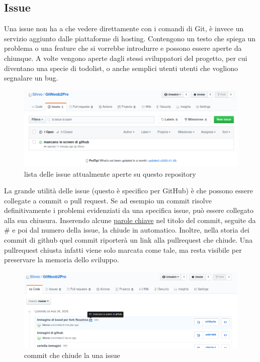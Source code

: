 \documentclass{article} \usepackage[textwidth=19cm,textheight=24cm]{geometry}
\begin{document}
\subsection{Issue}
Una issue non ha a che vedere direttamente con i comandi di Git, è invece un
servizio aggiunto dalle piattaforme di hosting. Contengono un testo che spiega
un problema o una feature che si vorrebbe introdurre e possono essere aperte da
chiunque.
A volte vengono aperte dagli stessi sviluppatori del progetto, per cui diventano
una specie di todolist, o anche semplici utenti utenti che vogliono segnalare un
bug.

\begin{figure}
\includegraphics[width=6in]{img/issue.png}
\centering
\caption{lista delle issue attualmente aperte su questo repository}
\end{figure}

La grande utilità delle issue (questo è specifico per GitHub) è che possono
essere collegate a commit o pull request. Se ad esempio un commit risolve
definitivamente i problemi evidenziati da una specifica issue, può essere
collegato alla sua chiusura.
Inserendo alcune 
\href{https://help.github.com/en/github/managing-your-work-on-github/linking-a-pull-request-to-an-issue}
{parole chiave}
nel titolo del commit, seguite da \# e poi dal numero della issue, la chiude in
automatico. Inoltre, nella storia dei commit di github quel commit riporterà un
link alla pullrequest che chiude. Una pullrequest chiusta infatti viene solo
marcata come tale, ma resta visibile per preservare la memoria dello sviluppo.

\begin{figure}
\includegraphics[width=6in]{img/commitCloseIssue.png}
\centering
\caption{commit che chiude la una issue}
\end{figure}
\end{document}
